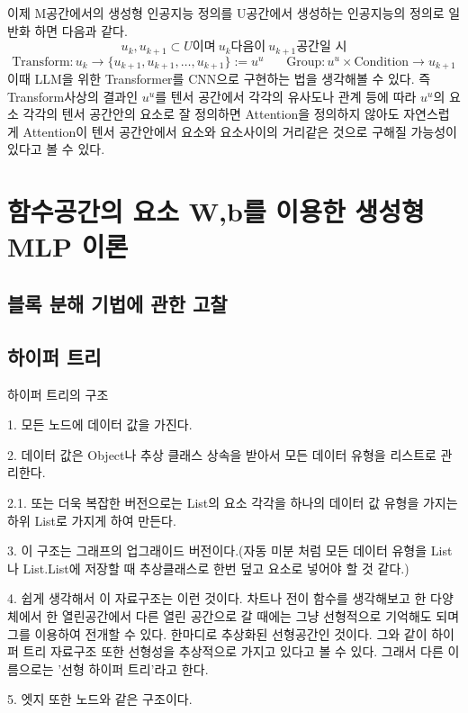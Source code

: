 \documentclass{book}
\begin{document}
이제 M공간에서의 생성형 인공지능 정의를 U공간에서 생성하는 인공지능의 정의로 일반화 하면 다음과 같다.
\[
u_k, u_{k+1} \subset U \text{이며}~ u_k \text{다음이}~ u_{k+1} \text{공간일 시}
\]
\[
\text{Transform} : u_k \rightarrow \{u_{k+1}, u_{k+1}, \ldots , u_{k+1}\} := u^u~~~~ ~~~~
\text{Group} : u^u \times \text{Condition} \rightarrow u_{k+1}
\]
이때 LLM을 위한 Transformer를 CNN으로 구현하는 법을 생각해볼 수 있다. 즉 Transform사상의 결과인 $u^u$를 텐서 공간에서 각각의 유사도나 관계 등에 따라 $u^u$의 요소 각각의 텐서 공간안의 요소로 잘 정의하면 Attention을 정의하지 않아도 자연스럽게 Attention이 텐서 공간안에서 요소와 요소사이의 거리같은 것으로 구해질 가능성이 있다고 볼 수 있다.

\part{함수공간의 요소 W,b를 이용한 생성형 MLP 이론}
\chapter{블록 분해 기법에 관한 고찰}
\chapter{하이퍼 트리}

하이퍼 트리의 구조

1. 모든 노드에 데이터 값을 가진다.

2. 데이터 값은 Object나 추상 클래스 상속을 받아서 모든 데이터 유형을 리스트로 관리한다.

2.1. 또는 더욱 복잡한 버전으로는 List의 요소 각각을 하나의 데이터 값 유형을 가지는 하위 List로 가지게 하여 만든다.

3. 이 구조는 그래프의 업그래이드 버전이다.(자동 미분 처럼 모든 데이터 유형을 List나 List.List에 저장할 때 추상클래스로 한번 덮고 요소로 넣어야 할 것 같다.)

4. 쉽게 생각해서 이 자료구조는 이런 것이다. 차트나 전이 함수를 생각해보고 한 다양체에서 한 열린공간에서 다른 열린 공간으로 갈 때에는 그냥 선형적으로 기억해도 되며 그를 이용하여 전개할 수 있다. 한마디로 추상화된 선형공간인 것이다. 그와 같이 하이퍼 트리 자료구조 또한 선형성을 추상적으로 가지고 있다고 볼 수 있다. 그래서 다른 이름으로는 '선형 하이퍼 트리'라고 한다.

5. 엣지 또한 노드와 같은 구조이다.
\end{document}
